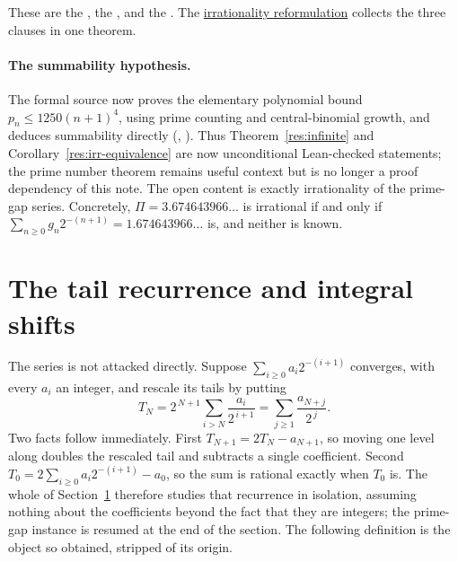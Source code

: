 \documentclass[11pt]{article}
\begin{document}
\noindent These are the
, the
, and the
.  The \href{https://github.com/wcook04/plectis-erdos/blob/f36a98bf3d3e6f65f1074e3b800e3293d5b8a51a/ErdosProblems/Erdos251/PaperCoreR7.lean#L56}{irrationality reformulation}
collects the three clauses in one theorem.

\paragraph{The summability hypothesis.}
The formal source now proves the elementary polynomial bound
$p_n\le1250(n+1)^4$, using prime counting and central-binomial growth, and
deduces summability directly
(,
).
Thus Theorem~\ref{res:infinite} and Corollary~\ref{res:irr-equivalence} are now
unconditional Lean-checked statements; the prime number theorem remains useful
context but is no longer a proof dependency of this note.  The open content is
exactly irrationality of the prime-gap series.  Concretely,
$\Pi=3.674643966\ldots$ is irrational if and only if
$\sum_{n\ge0}g_n2^{-(n+1)}=1.674643966\ldots$ is, and neither is known.

\section{The tail recurrence and integral shifts}\label{sec:tail}

The series is not attacked directly.  Suppose $\sum_{i\ge0}a_i2^{-(i+1)}$
converges, with every $a_i$ an integer, and rescale its tails by putting
\[
 T_N=2^{\,N+1}\sum_{i>N}\frac{a_i}{2^{\,i+1}}
    =\sum_{j\ge1}\frac{a_{N+j}}{2^{\,j}} .
\]
Two facts follow immediately.  First $T_{N+1}=2T_N-a_{N+1}$, so moving one
level along doubles the rescaled tail and subtracts a single coefficient.
Second $T_0=2\sum_{i\ge0}a_i2^{-(i+1)}-a_0$, so the sum is rational exactly
when $T_0$ is.  The whole of Section~\ref{sec:tail} therefore studies that
recurrence in isolation, assuming nothing about the coefficients beyond the
fact that they are integers; the prime-gap instance is resumed at the end of
the section.  The following definition is the object so obtained, stripped of
its origin.
\end{document}
